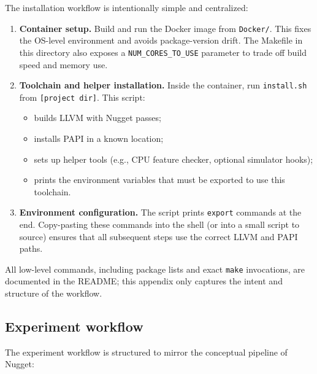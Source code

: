 The installation workflow is intentionally simple and centralized:

\begin{enumerate}
  \item \textbf{Container setup.} Build and run the Docker image from \texttt{Docker/}. This fixes the OS-level environment and avoids package-version drift. The Makefile in this directory also exposes a \texttt{NUM\_CORES\_TO\_USE} parameter to trade off build speed and memory use.
  \item \textbf{Toolchain and helper installation.} Inside the container, run \texttt{install.sh} from \texttt{[project dir]}. This script:
    \begin{itemize}
      \item builds LLVM with Nugget passes;
      \item installs PAPI in a known location;
      \item sets up helper tools (e.g., CPU feature checker, optional simulator hooks);
      \item prints the environment variables that must be exported to use this toolchain.
    \end{itemize}
  \item \textbf{Environment configuration.} The script prints \texttt{export} commands at the end. Copy-pasting these commands into the shell (or into a small script to source) ensures that all subsequent steps use the correct LLVM and PAPI paths.
\end{enumerate}

All low-level commands, including package lists and exact \texttt{make} invocations, are documented in the README; this appendix only captures the intent and structure of the workflow.

\subsection{Experiment workflow}

The experiment workflow is structured to mirror the conceptual pipeline of Nugget:

